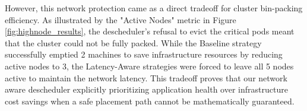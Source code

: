 However, this network protection came as a direct tradeoff for cluster bin-packing efficiency. As illustrated by the "Active Nodes" metric in Figure \ref{fig:highnode_results}, the descheduler's refusal to evict the critical pods meant that the cluster could not be fully packed. While the Baseline strategy successfully emptied 2 machines to save infrastructure resources by reducing active nodes to 3, the Latency-Aware strategies were forced to leave all 5 nodes active to maintain the network latency. This tradeoff proves that our network aware descheduler explicitly prioritizing application health over infrastructure cost savings when a safe placement path cannot be mathematically guaranteed.

\begin{figure}[tbp]
    \centering
\end{figure}
